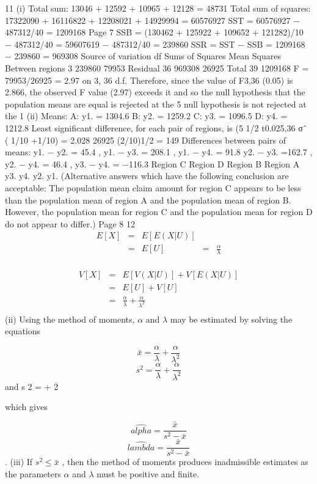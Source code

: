\documentclass[a4paper,12pt]{article}
\begin{document}
11 (i) Total sum: 13046 + 12592 + 10965 + 12128 = 48731
Total sum of squares: 17322090 + 16116822 + 12208021 + 14929994
= 60576927
SST = 60576927 − 487312/40 = 1209168
Page 7
SSB = (130462 + 125922 + 109652 + 121282)/10 − 487312/40
= 59607619 − 487312/40 = 239860
SSR = SST − SSB = 1209168 − 239860 = 969308
Source of variation df Sums of Squares Mean Squares
Between regions 3 239860 79953
Residual 36 969308 26925
Total 39 1209168
F = 79953/26925 = 2.97 on 3, 36 d.f.
Therefore, since the value of F3,36 (0.05) is 2.866, the observed F value (2.97)
exceeds it and so the null hypothesis that the population means are equal is
rejected at the 5%
null hypothesis is not rejected at the 1%
(ii) Means:
A: y1. = 1304.6 B: y2. = 1259.2
C: y3. = 1096.5 D: y4. = 1212.8
Least significant difference, for each pair of regions, is (5%
1/2
t0.025,36 σˆ ( 1/10 +1/10) = 2.028 26925 (2/10)1/2 = 149
Differences between pairs of means:
y1. − y2. = 45.4 , y1. − y3. = 208.1 , y1. − y4. = 91.8
y2. − y3. =162.7 , y2. − y4. = 46.4 , y3. − y4. = −116.3
Region C Region D Region B Region A
y3. y4. y2. y1.
(Alternative answers which have the following conclusion are acceptable:
The population mean claim amount for region C appears to be less than the
population mean of region A and the population mean of region B. However,
the population mean for region C and the population mean for region D do not
appear to differ.)
Page 8
12 
\begin{eqnarray*}
E [ X ] &=& E [ E ( X | U )] \\ &=& E [ U ] &=& \frac{\alpha }{\lambda}\\
\end{eqnarray*}

\begin{eqnarray*}
V [ X ] &=& E [ V ( X | U )] + V [ E ( X | U )] \\ &=& E [ U ] + V [ U ]  \\ &=& \frac{\alpha }{\lambda} + \frac{\alpha }{\lambda^2}\\
\end{eqnarray*}
(ii)
Using the method of moments, $\alpha$ and $\lambda$ may be estimated by solving the
equations

\[ \bar{x} = \frac{\alpha}{\lambda} + \frac{\alpha}{\lambda^2}\]
\[ s^2 = \frac{\alpha}{\lambda} + \frac{\alpha}{\lambda^2}\]
and s 2 = + 2

which gives

\[ \hat{alpha} = \frac{ \bar{x} }{s^2 − \bar{x} } \]
\[ \hat{lambda} = \frac{ \bar{x} }{s^2 − \bar{x} } \]
.
(iii) If $s^2 \leq \bar{x}$ , then the method of moments produces inadmissible estimates as the
parameters $\alpha$ and $\lambda$ must be positive and finite.
\end{document}
